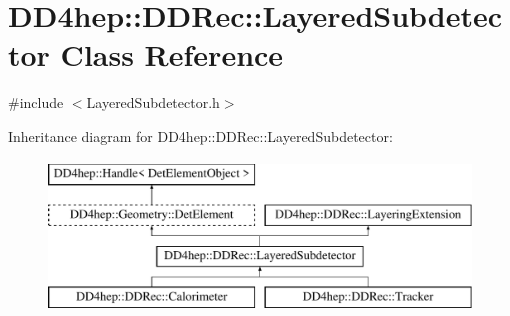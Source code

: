 \hypertarget{class_d_d4hep_1_1_d_d_rec_1_1_layered_subdetector}{}\section{D\+D4hep\+:\+:D\+D\+Rec\+:\+:Layered\+Subdetector Class Reference}
\label{class_d_d4hep_1_1_d_d_rec_1_1_layered_subdetector}


{\ttfamily \#include $<$Layered\+Subdetector.\+h$>$}

Inheritance diagram for D\+D4hep\+:\+:D\+D\+Rec\+:\+:Layered\+Subdetector\+:\begin{figure}[H]
\begin{center}
\leavevmode
\includegraphics[height=4.000000cm]{class_d_d4hep_1_1_d_d_rec_1_1_layered_subdetector}
\end{center}
\end{figure}
